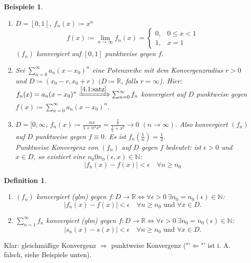 \documentclass[titlepage,ngerman,a4paper,headsepline]{scrartcl}
\newcommand{\N}{\mathbb{N}}
\newcommand{\R}{\mathbb{R}}
\theoremstyle{named}
\theoremstyle{dotless}
\newtheorem*{beispiele}{Beispiele}
\newtheorem*{definition}{Definition}
\begin{document}
\begin{beispiele} ~\
	\begin{enumerate}
		\item $D = [0,1]$, $f_{n}(x) \coloneqq x^{n}$ %
			$$ f(x) \coloneqq \lim_{n\rightarrow\infty} f_{n}(x) = \begin{cases} 0, & 0 \leq x < 1 \\  1, & x = 1 \end{cases} $$
			$(f_{n})$ konvergiert auf $[0, 1]$ punktweise gegen $f$.
		\item Sei $\sum_{n=0}^{\infty} a_{n} (x-x_{0})^{n}$ eine Potenzreihe mit dem Konvergenzradius $r > 0$ und $D \coloneqq (x_{0} - r, x_{0} + r)$ $(D \coloneqq \R$, falls $r = \infty$). Hier: $f_{n}(x) = a_{n} (x - x_{0})^{n} \xRightarrow[]{\ref{4.1:satz}} \sum_{n=0}^{\infty} f_{n}$ konvergiert auf $D$ punktweise gegen $f(x) \coloneqq \sum_{n=0}^{\infty} a_{n} (x-x_{0})^{n}$.
		\item $D = [0, \infty$, $f_{n}(x) \coloneqq \frac{nx}{1+n^{2}x^{2}} = \frac{\frac{x}{n}}{\frac{1}{n} + x^{2}} \rightarrow 0$ $(n \rightarrow \infty)$. Also konvergiert $(f_{n})$ auf $D$ punktweise gegen $f \equiv 0$. Es ist $f_{n}(\frac{1}{n}) = \frac{1}{2}$. \\
			Punktweise Konvergenz von $(f_{n})$ auf $D$ gegen $f$ bedeutet: ist $\epsilon > 0$ und $x \in D$, so existiert eine $n_{0} 0 n_{0}(\epsilon, x) \in \N$:
			$$ |f_{n}(x) - f(x)| < \epsilon \quad \forall n \geq n_{0} $$
	\end{enumerate}
\end{beispiele}


\begin{definition} ~\
	\begin{enumerate}
		\item $(f_{n})$ konvergiert  (glm) gegen $f \colon D \rightarrow \R \iff \forall \epsilon > 0 ~\exists n_{0} = n_{0}(\epsilon) \in \N$:
			$$ |f_{n}(x) - f(x)|< \epsilon \quad \forall n \geq n_{0} \text{ und } \forall x \in D. $$
		\item $\sum_{n=1}^{\infty} f_{n}$  konvergiert \text{auf D gleichmä{\ss}ig} (glm) gegen $f \colon D \rightarrow \R \iff \forall \epsilon > 0 ~\exists n_{0} = n_{0}(\epsilon) \in \N$:
			$$ |s_{n}(x) - s(x)|< \epsilon \quad \forall n \geq n_{0} \text{ und } \forall x \in D. $$
	\end{enumerate}
\end{definition}

Klar: gleichmä{\ss}ige Konvergenz $\Rightarrow$ punktweise Konvergenz ("'$\Leftarrow$"' ist i. A. falsch, siehe Beispiele unten).
\end{document}
